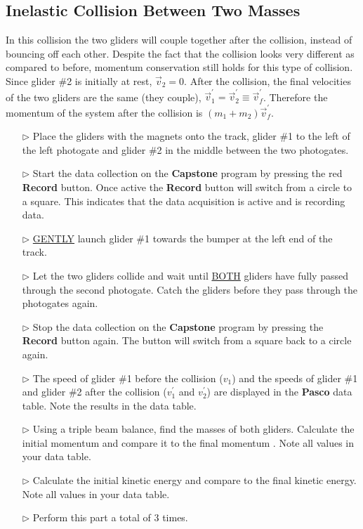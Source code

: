 \subsection{Inelastic Collision Between Two Masses}

In this collision the two gliders will couple together after the collision, instead of bouncing off each other. Despite the fact that the collision looks very different as compared to before, momentum conservation still holds for this type of collision.
%
Since glider \#2 is initially at rest,  $\vec{v}_2 = 0$.  After the collision, the final velocities of the two gliders are the same (they couple), $\vec{v}_1^\prime = \vec{v}_2^\prime \equiv \vec{v}_f^\prime$. Therefore the momentum of the system after the collision is $(m_1 + m_2) \vec{v}_f^\prime$.

\begin{itemize}
\item[$\triangleright$] Place the gliders with the magnets onto the track, glider \#1 to the left of the left photogate and glider \#2 in the middle between the two photogates.
\item[$\triangleright$] Start the data collection on the \textbf{Capstone} program by pressing the red \textbf{Record} button. Once active the \textbf{Record} button will switch from a circle to a square. This indicates that the data acquisition is active and is recording data.
\item[$\triangleright$] \underline{GENTLY} launch glider \#1 towards the bumper at the left end of the track.
\item[$\triangleright$] Let the two gliders collide and wait until \underline{BOTH} gliders have fully passed through the second photogate. Catch the gliders before they pass through the photogates again.
\item[$\triangleright$] Stop the data collection on the \textbf{Capstone} program by pressing the \textbf{Record} button again. The button will switch from a square back to a circle again.
\item[$\triangleright$] The speed of glider \#1 before the collision ($v_1$) and the speeds of glider \#1 and glider \#2 after the collision ($v_1^\prime$ and $v_2^\prime$) are displayed in the \textbf{Pasco} data table. Note the results in the data table.
\item[$\triangleright$] Using a triple beam balance, find the masses of both gliders.  Calculate the initial momentum and compare it to the final momentum . Note all values in your data table.
\item[$\triangleright$] Calculate the initial kinetic energy and compare to the final kinetic energy. Note all values in your data table.
\item[$\triangleright$] Perform this part a total of 3 times.
\end{itemize}

